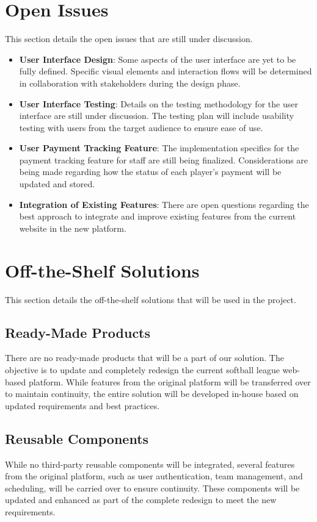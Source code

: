 \documentclass[12pt, titlepage]{article}
\begin{document}
\section{Open Issues}
This section details the open issues that are still under discussion.
\begin{itemize}
    \item \textbf{User Interface Design}: Some aspects of the user interface are yet to be fully defined. Specific visual elements and interaction flows will be determined in collaboration with stakeholders during the design phase.
    \item \textbf{User Interface Testing}: Details on the testing methodology for the user interface are still under discussion. The testing plan will include usability testing with users from the target audience to ensure ease of use.
    \item \textbf{User Payment Tracking Feature}: The implementation specifics for the payment tracking feature for staff are still being finalized. Considerations are being made regarding how the status of each player's payment will be updated and stored.
    \item \textbf{Integration of Existing Features}: There are open questions regarding the best approach to integrate and improve existing features from the current website in the new platform.
\end{itemize}

\section{Off-the-Shelf Solutions}
This section details the off-the-shelf solutions that will be used in the project.
\subsection{Ready-Made Products}
There are no ready-made products that will be a part of our solution. The objective is to update and completely redesign the current softball league web-based platform. While features from the original platform will be transferred over to maintain continuity, the entire solution will be developed in-house based on updated requirements and best practices.

\subsection{Reusable Components}
While no third-party reusable components will be integrated, several features from the original platform, such as user authentication, team management, and scheduling, will be carried over to ensure continuity. These components will be updated and enhanced as part of the complete redesign to meet the new requirements.
\end{document}
